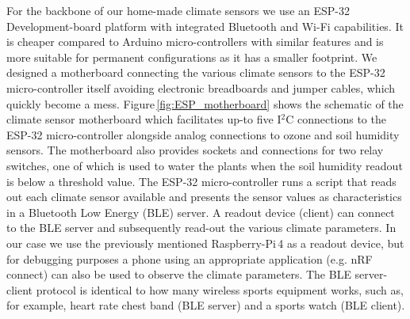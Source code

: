 \documentclass[reprint,superscriptaddress,aps,amsmath,amssymb]{revtex4-1}
\begin{document}
For the backbone of our home-made climate sensors we use an ESP-32 Development-board platform with integrated Bluetooth and Wi-Fi capabilities. It is cheaper compared to Arduino micro-controllers with similar features and is more suitable for permanent configurations as it has a smaller footprint. We designed a motherboard connecting the various climate sensors to the ESP-32 micro-controller itself avoiding electronic breadboards and jumper cables, which quickly become a mess. Figure\,\ref{fig:ESP_motherboard} shows the schematic of the climate sensor motherboard which facilitates up-to five I$^2$C connections to the ESP-32 micro-controller alongside analog connections to ozone and soil humidity sensors. The motherboard also provides sockets and connections for two relay switches, one of which is used to water the plants when the soil humidity readout is below a threshold value. The ESP-32 micro-controller runs a script that reads out each climate sensor available and presents the sensor values as characteristics in a Bluetooth Low Energy (BLE) server. A readout device (client) can connect to the BLE server and subsequently read-out the various climate parameters. In our case we use the previously mentioned Raspberry-Pi\,4 as a readout device, but for debugging purposes a phone using an appropriate application (e.g. nRF connect) can also be used to observe the climate parameters. The BLE server-client protocol is identical to how many wireless sports equipment works, such as, for example, heart rate chest band (BLE server) and a sports watch (BLE client). 
\end{document}
